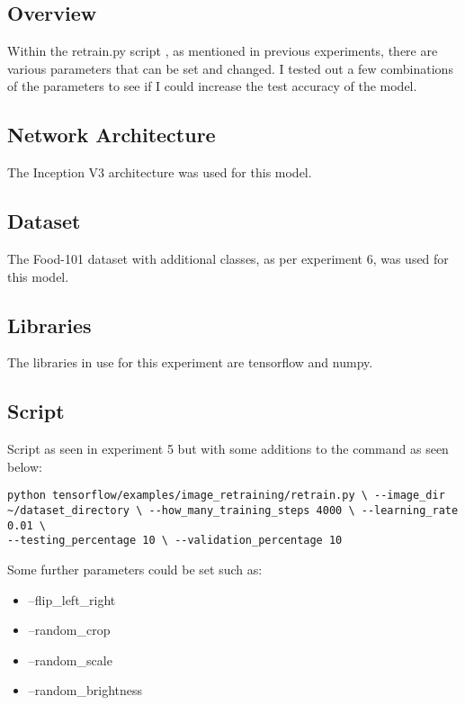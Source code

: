 \subsection*{Overview}
Within the retrain.py script \textcite{retrainInception}, as mentioned in
previous experiments, there are various parameters that can be set and changed.
I tested out a few combinations of the parameters to see if I could increase the
test accuracy of the model.

\subsection*{Network Architecture}
The Inception V3 architecture was used for this model.

\subsection*{Dataset}
The Food-101 dataset \textcite{food101} with additional classes, as per
experiment 6, was used for this model.

\subsection*{Libraries}
The libraries in use for this experiment are tensorflow and numpy.

\subsection*{Script}
Script as seen in experiment 5 but with some additions to the command as seen
below:

\begin{lstlisting}
python tensorflow/examples/image_retraining/retrain.py \ --image_dir
~/dataset_directory \ --how_many_training_steps 4000 \ --learning_rate 0.01 \
--testing_percentage 10 \ --validation_percentage 10
\end{lstlisting}

Some further parameters could be set such as:
\begin{itemize}
	\item{--flip_left_right}
	\item{--random_crop}
	\item{--random_scale}
	\item{--random_brightness}
\end{itemize}

